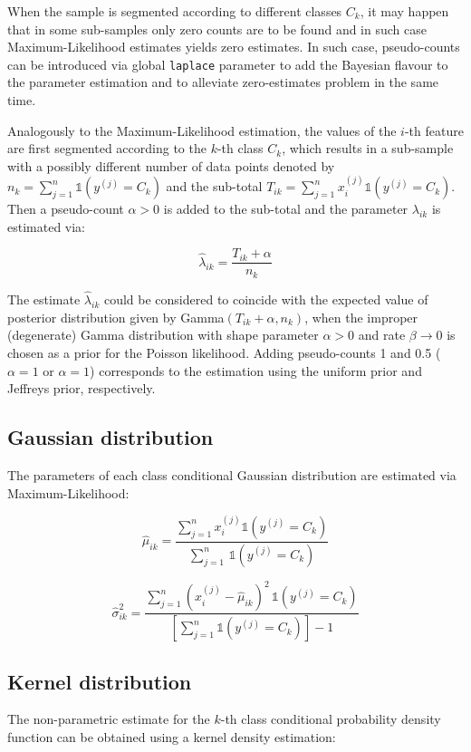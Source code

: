 \documentclass{article}\usepackage[]{graphicx}\usepackage[]{color}
\begin{document}
When the sample is segmented according to different classes $C_k$, it may happen that in some sub-samples only zero counts are to be found and in such case Maximum-Likelihood estimates yields zero estimates. In such case, pseudo-counts can be introduced via global \texttt{laplace} parameter to add the Bayesian flavour to the parameter estimation and to alleviate zero-estimates problem in the same time.


Analogously to the Maximum-Likelihood estimation, the values of the $i$-th feature are first segmented according to the $k$-th class $C_k$, which results in a sub-sample with a possibly different number of data points denoted by $n_k = \sum_{j=1}^n \mathbb{1}(y^{(j)} = C_k)$ and the sub-total $T_{ik} = \sum_{j=1}^n x_i^{(j)}\mathbb{1}(y^{(j)} = C_k)$. Then a pseudo-count $\alpha > 0$ is added to the sub-total and the parameter $\lambda_{ik}$ is estimated via:

$$\hat{\lambda}_{ik} = \frac{T_{ik} + \alpha}{n_k}$$

The estimate $\hat{\lambda}_{ik}$ could be considered to coincide with the expected value of posterior distribution given by Gamma$(T_{ik} + \alpha, n_k)$, when the improper (degenerate) Gamma distribution with shape parameter $\alpha > 0$ and rate $\beta \rightarrow 0$ is chosen as a prior for the Poisson likelihood. Adding pseudo-counts 1 and 0.5 ($\alpha = 1$ or $\alpha = 1$) corresponds to the estimation using the uniform prior and Jeffreys  prior, respectively.


\subsection{Gaussian distribution}

The parameters of each class conditional Gaussian distribution are estimated via Maximum-Likelihood:

$$\hat{\mu}_{ik} = \frac{\sum_{j=1}^n x_i^{(j)} \mathbb{1}(y^{(j)} = C_k) }{\sum_{j=1}^n \, \mathbb{1}(y^{(j)} = C_k)}$$

$$\hat{\sigma}^2_{ik} = \frac{\sum_{j=1}^n (x_i^{(j)} - \hat{\mu}_{ik})^2 \, \mathbb{1}(y^{(j)} = C_k) }{\left[ \sum_{j=1}^n  \mathbb{1}(y^{(j)} = C_k) \right] - 1}$$


\subsection{Kernel distribution}

The non-parametric estimate for the $k$-th class conditional probability density function can be obtained using a kernel density estimation:
\end{document}
